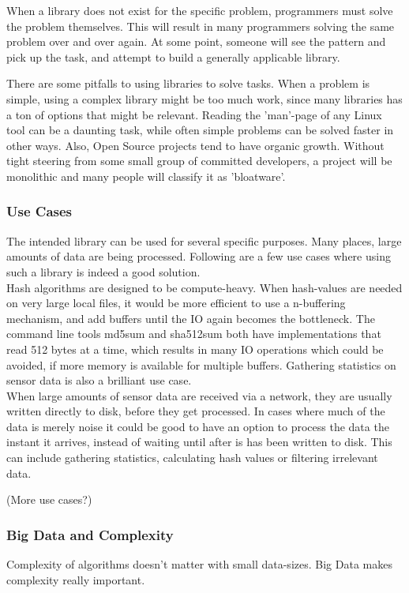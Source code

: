 \documentclass[a4paper]{article}
\begin{document}
When a library does not exist for the specific problem, programmers must solve the problem themselves. This will
result in many programmers solving the same problem over and over again. At some point, someone will see the pattern
and pick up the task, and attempt to build a generally applicable library.

There are some pitfalls to using libraries to solve tasks. When a problem is simple, using a complex library might
be too much work, since many libraries has a ton of options that might be relevant. Reading the 'man'-page of any
Linux tool can be a daunting task, while often simple problems can be solved faster in other ways. Also, Open Source
projects tend to have organic growth. Without tight steering from some small group of committed developers, a project
will be monolithic and many people will classify it as 'bloatware'.



\subsubsection{Use Cases}
The intended library can be used for several specific purposes. Many places, large amounts of data are being processed.
Following are a few use cases where using such a library is indeed a good solution.\\


Hash algorithms are designed to be compute-heavy. When hash-values are needed on very large local files, it would
be more efficient to use a n-buffering mechanism, and add buffers until the IO again becomes the bottleneck. The
command line tools md5sum and sha512sum both have implementations that read 512 bytes at a time, which results in
many IO operations which could be avoided, if more memory is available for multiple buffers. Gathering statistics
on sensor data is also a brilliant use case.\\


When large amounts of sensor data are received via a network, they are usually written directly to disk, before
they get processed. In cases where much of the data is merely noise it could be good to have an option to process
the data the instant it arrives, instead of waiting until after is has been written to disk. This can include
gathering statistics, calculating hash values or filtering irrelevant data.

(More use cases?)



\subsubsection{Big Data and Complexity}
Complexity of algorithms doesn't matter with small data-sizes. Big Data makes complexity really important.
\end{document}
